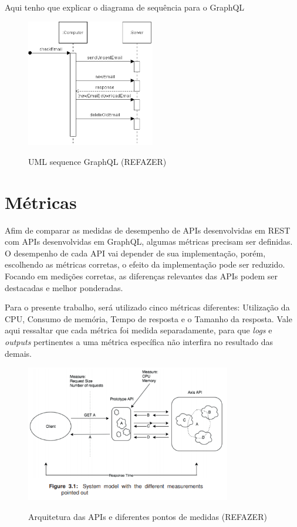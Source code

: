 Aqui tenho que explicar o diagrama de sequência para o GraphQL

\begin{figure}[htbp]
\centering
\includegraphics[width=0.5\textwidth]{figuras/uml-sequence.png}
\label{fig:graph-uml}
\caption{UML sequence GraphQL (REFAZER)}
\author{fonte: Autor}
\end{figure}
\pagebreak


\section{Métricas}\label{sec:metrics}

Afim de comparar as medidas de desempenho de APIs desenvolvidas em REST com APIs desenvolvidas em GraphQL, algumas métricas precisam ser definidas. O desempenho de cada API vai depender de sua implementação, porém, escolhendo as métricas corretas, o efeito da implementação pode ser reduzido. Focando em medições corretas, as diferenças relevantes das APIs podem ser destacadas e melhor ponderadas.

Para o presente trabalho, será utilizado cinco métricas diferentes: Utilização da CPU, Consumo de memória, Tempo de resposta e o Tamanho da resposta. Vale aqui ressaltar que cada métrica foi medida separadamente, para que \textit{logs} e \textit{outputs} pertinentes a uma métrica específica não interfira no resultado das demais.

\begin{figure}[htbp]
\centering
\includegraphics[width=0.8\textwidth]{figuras/metricas.PNG}
\label{fig:my-model}
\caption{Arquitetura das APIs e diferentes pontos de medidas (REFAZER)}
\author{fonte: Autor}
\end{figure}
\pagebreak


